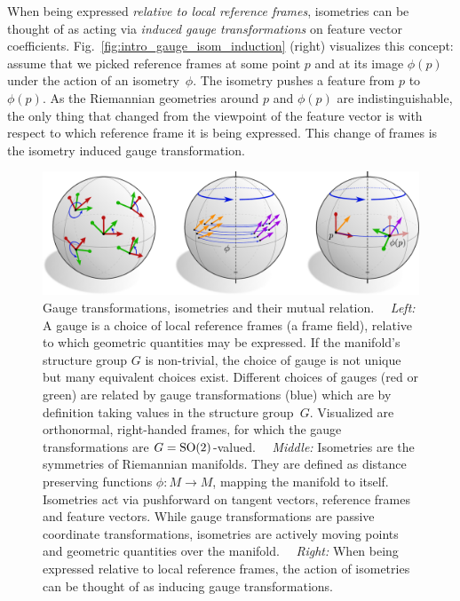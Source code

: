When being expressed \emph{relative to local reference frames}, isometries can be thought of as acting via \emph{induced gauge transformations} on feature vector coefficients.
Fig.~\ref{fig:intro_gauge_isom_induction} (right) visualizes this concept:
assume that we picked reference frames at some point $p$ and at its image $\phi(p)$ under the action of an isometry~$\phi$.
The isometry pushes a feature from $p$ to $\phi(p)$.
As the Riemannian geometries around $p$ and $\phi(p)$ are indistinguishable, the only thing that changed from the viewpoint of the feature vector is with respect to which reference frame it is being expressed.
This change of frames is the isometry induced gauge transformation.

\begin{figure}
    \centering
    \includegraphics[width=.98\columnwidth]{figures/intro_gauge_isom_equiv.pdf}
    \vspace*{-1ex}
    \caption{\small
        Gauge transformations, isometries and their mutual relation.
        \ \ \emph{Left:}
        A gauge is a choice of local reference frames (a frame field), relative to which geometric quantities may be expressed.
        If the manifold's structure group $G$ is non-trivial, the choice of gauge is not unique but many equivalent choices exist.
        Different choices of gauges (red or green) are related by gauge transformations (blue) which are by definition taking values in the structure group~$G$.
        Visualized are orthonormal, right-handed frames, for which the gauge transformations are $G=\operatorname{SO}(2)$-valued.
        \ \ \emph{Middle:}
        Isometries are the symmetries of Riemannian manifolds.
        They are defined as distance preserving functions $\phi: M \to M$, mapping the manifold to itself.
        Isometries act via pushforward on tangent vectors, reference frames and feature vectors.
        While gauge transformations are passive coordinate transformations, isometries are actively moving points and geometric quantities over the manifold.
        \ \ \emph{Right:}
        When being expressed relative to local reference frames, the action of isometries can be thought of as inducing gauge transformations.
}
\end{figure}
